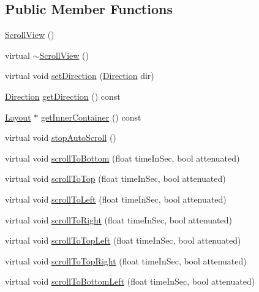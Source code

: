 \subsection*{Public Member Functions}
\begin{DoxyCompactItemize}
\item 
\hyperlink{classui_1_1ScrollView_afe9273a62ee4829f87d13a22e0576ac7}{Scroll\+View} ()
\item 
virtual \hyperlink{classui_1_1ScrollView_a4a5220ac36e0c7d03973be1bdde8d7a1}{$\sim$\+Scroll\+View} ()
\item 
virtual void \hyperlink{classui_1_1ScrollView_a7b30815b6ca380b56c974b6c0b6aa78e}{set\+Direction} (\hyperlink{classui_1_1ScrollView_aed2d778ae8098dcafe323b2beae8dd6b}{Direction} dir)
\item 
\hyperlink{classui_1_1ScrollView_aed2d778ae8098dcafe323b2beae8dd6b}{Direction} \hyperlink{classui_1_1ScrollView_a9ab2bc7f51dfbfbacce0b2f25f47c680}{get\+Direction} () const
\item 
\hyperlink{classui_1_1Layout}{Layout} $\ast$ \hyperlink{classui_1_1ScrollView_aaca79776e46b13760419443226070efd}{get\+Inner\+Container} () const
\item 
virtual void \hyperlink{classui_1_1ScrollView_a1b7003ef22b8a25adc78211937f388d2}{stop\+Auto\+Scroll} ()
\item 
virtual void \hyperlink{classui_1_1ScrollView_aaadf1e2477086b137b845f88e72abce3}{scroll\+To\+Bottom} (float time\+In\+Sec, bool attenuated)
\item 
virtual void \hyperlink{classui_1_1ScrollView_ae4f80c33a24a47a06b336bf19c4d0f4f}{scroll\+To\+Top} (float time\+In\+Sec, bool attenuated)
\item 
virtual void \hyperlink{classui_1_1ScrollView_a363815ef6b3de5fc4c5d913a9c954c20}{scroll\+To\+Left} (float time\+In\+Sec, bool attenuated)
\item 
virtual void \hyperlink{classui_1_1ScrollView_ad10f911c5b7b0edf30da89e3ca5562fe}{scroll\+To\+Right} (float time\+In\+Sec, bool attenuated)
\item 
virtual void \hyperlink{classui_1_1ScrollView_a818acfca4fe216bc428c20674b6cf916}{scroll\+To\+Top\+Left} (float time\+In\+Sec, bool attenuated)
\item 
virtual void \hyperlink{classui_1_1ScrollView_adaaf96b7ae849a819209564879bfb404}{scroll\+To\+Top\+Right} (float time\+In\+Sec, bool attenuated)
\item 
virtual void \hyperlink{classui_1_1ScrollView_a790fc2a5c704a876745fcf262605cb49}{scroll\+To\+Bottom\+Left} (float time\+In\+Sec, bool attenuated)

\end{DoxyCompactItemize}
